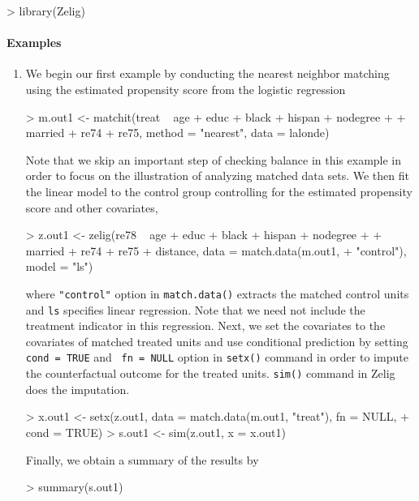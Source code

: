 \begin{Schunk}
\begin{Sinput}
> library(Zelig)
\end{Sinput}
\end{Schunk}

\paragraph{Examples}
\begin{enumerate}
\item We begin our first example by conducting the nearest neighbor
  matching using the estimated propensity score from the logistic
  regression
\begin{Schunk}
\begin{Sinput}
> m.out1 <- matchit(treat ~ age + educ + black + hispan + nodegree + 
+     married + re74 + re75, method = "nearest", data = lalonde)
\end{Sinput}
\end{Schunk}
Note that we skip an important step of checking balance in this
example in order to focus on the illustration of analyzing matched
data sets. We then fit the linear model to the control group
controlling for the estimated propensity score and other covariates,
\begin{Schunk}
\begin{Sinput}
> z.out1 <- zelig(re78 ~ age + educ + black + hispan + nodegree + 
+     married + re74 + re75 + distance, data = match.data(m.out1, 
+     "control"), model = "ls")
\end{Sinput}
\end{Schunk}
where {\tt "control"} option in {\tt match.data()} extracts the
matched control units and {\tt ls} specifies linear regression. Note
that we need not include the treatment indicator in this regression.
Next, we set the covariates to the covariates of matched treated units
and use conditional prediction by setting {\tt cond = TRUE} and {\tt
  fn = NULL} option in {\tt setx()} command in order to impute the
counterfactual outcome for the treated units. {\tt sim()} command in
Zelig does the imputation.
\begin{Schunk}
\begin{Sinput}
> x.out1 <- setx(z.out1, data = match.data(m.out1, "treat"), fn = NULL, 
+     cond = TRUE)
> s.out1 <- sim(z.out1, x = x.out1)
\end{Sinput}
\end{Schunk}
Finally, we obtain a summary of the results by 
\begin{Schunk}
\begin{Sinput}
> summary(s.out1)
\end{Sinput}
\begin{Soutput}


\end{Soutput}
\end{Schunk}
\end{enumerate}
